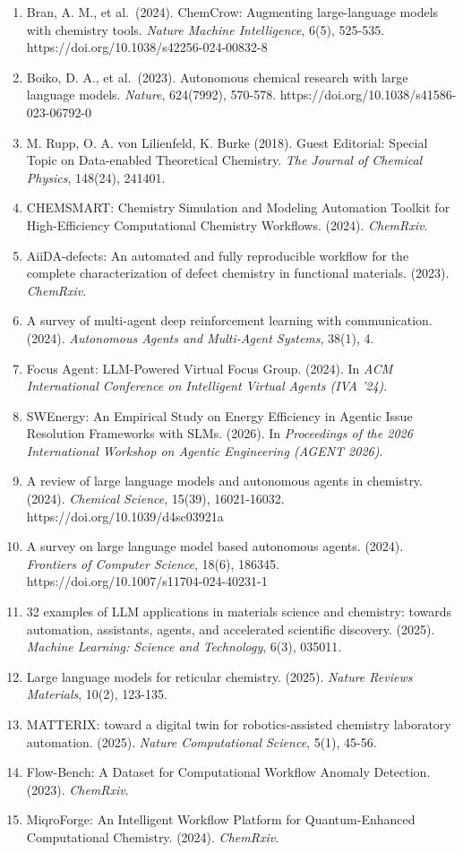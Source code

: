 \begin{enumerate}
\def\labelenumi{\arabic{enumi}.}
\tightlist
\item
  Bran, A. M., et al.~(2024). ChemCrow: Augmenting large-language models
  with chemistry tools. \emph{Nature Machine Intelligence}, 6(5),
  525-535. https://doi.org/10.1038/s42256-024-00832-8
\item
  Boiko, D. A., et al.~(2023). Autonomous chemical research with large
  language models. \emph{Nature}, 624(7992), 570-578.
  https://doi.org/10.1038/s41586-023-06792-0
\item
  M. Rupp, O. A. von Lilienfeld, K. Burke (2018). Guest Editorial:
  Special Topic on Data-enabled Theoretical Chemistry. \emph{The Journal
  of Chemical Physics}, 148(24), 241401.
\item
  CHEMSMART: Chemistry Simulation and Modeling Automation Toolkit for
  High-Efficiency Computational Chemistry Workflows. (2024).
  \emph{ChemRxiv}.
\item
  AiiDA-defects: An automated and fully reproducible workflow for the
  complete characterization of defect chemistry in functional materials.
  (2023). \emph{ChemRxiv}.
\item
  A survey of multi-agent deep reinforcement learning with
  communication. (2024). \emph{Autonomous Agents and Multi-Agent
  Systems}, 38(1), 4.
\item
  Focus Agent: LLM-Powered Virtual Focus Group. (2024). In \emph{ACM
  International Conference on Intelligent Virtual Agents (IVA '24)}.
\item
  SWEnergy: An Empirical Study on Energy Efficiency in Agentic Issue
  Resolution Frameworks with SLMs. (2026). In \emph{Proceedings of the
  2026 International Workshop on Agentic Engineering (AGENT 2026)}.
\item
  A review of large language models and autonomous agents in chemistry.
  (2024). \emph{Chemical Science}, 15(39), 16021-16032.
  https://doi.org/10.1039/d4sc03921a
\item
  A survey on large language model based autonomous agents. (2024).
  \emph{Frontiers of Computer Science}, 18(6), 186345.
  https://doi.org/10.1007/s11704-024-40231-1
\item
  32 examples of LLM applications in materials science and chemistry:
  towards automation, assistants, agents, and accelerated scientific
  discovery. (2025). \emph{Machine Learning: Science and Technology},
  6(3), 035011.
\item
  Large language models for reticular chemistry. (2025). \emph{Nature
  Reviews Materials}, 10(2), 123-135.
\item
  MATTERIX: toward a digital twin for robotics-assisted chemistry
  laboratory automation. (2025). \emph{Nature Computational Science},
  5(1), 45-56.
\item
  Flow-Bench: A Dataset for Computational Workflow Anomaly Detection.
  (2023). \emph{ChemRxiv}.
\item
  MiqroForge: An Intelligent Workflow Platform for Quantum-Enhanced
  Computational Chemistry. (2024). \emph{ChemRxiv}.
\end{enumerate}
